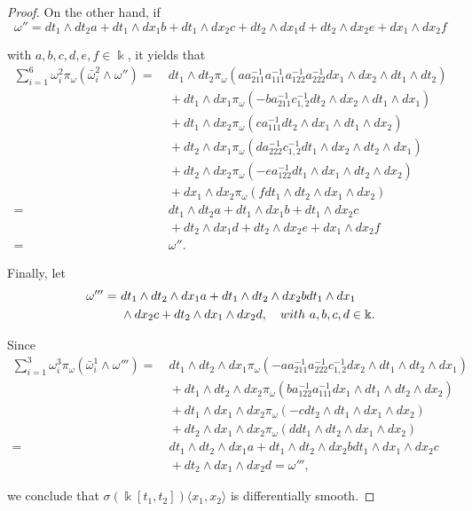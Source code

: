 \documentclass{amsart}
\theoremstyle{definition}
\theoremstyle{remark}
\numberwithin{equation}{section}
\begin{document}
\begin{proof}
On the other hand, if 
\[
\omega'' = dt_1\wedge dt_2a+dt_1\wedge dx_1 b+dt_1\wedge dx_2 c+dt_2\wedge dx_1d+dt_2\wedge dx_2e+dx_1\wedge dx_2f 
\]

with $a,b,c,d,e,f \in \Bbbk$, it yields that 
\begin{align*}
\sum_{i=1}^{6}\omega_{i}^{2}\pi_{\omega}(\bar{\omega}_i^{2}\wedge \omega'') = &\ dt_1\wedge dt_2\pi_{\omega}(aa_{211}^{-1}a_{111}^{-1}a_{122}^{-1}a_{222}^{-1}dx_1\wedge dx_2\wedge dt_1\wedge dt_2) \\
    &\ + dt_1\wedge dx_1\pi_{\omega}(-ba_{211}^{-1}c_{1,2}^{-1}dt_2\wedge dx_2\wedge dt_1\wedge dx_1) \\
    &\ +dt_1\wedge dx_2\pi_{\omega}(ca_{111}^{-1}dt_2\wedge dx_1\wedge dt_1\wedge dx_2) \\
    &\ +dt_2\wedge dx_1\pi_{\omega}(da_{222}^{-1}c_{1,2}^{-1}dt_1\wedge dx_2\wedge dt_2\wedge dx_1) \\
    &\ +dt_2\wedge dx_2\pi_{\omega}(-ea_{122}^{-1}dt_1\wedge dx_1\wedge dt_2\wedge dx_2) \\
    &\ +dx_1\wedge dx_2\pi_{\omega}(fdt_1\wedge dt_2\wedge dx_1\wedge dx_2) \\
    = &\ dt_1\wedge dt_2a+dt_1\wedge dx_1 b+dt_1\wedge dx_2 c \\
    &\ + dt_2\wedge dx_1d+dt_2\wedge dx_2e+dx_1\wedge dx_2f \\
    = &\ \omega''.
\end{align*}

Finally, let 
\begin{align*}
\omega''' = &\ dt_1\wedge dt_2 \wedge dx_1 a+ dt_1\wedge dt_2\wedge dx_2 b dt_1\wedge dx_1 \\
&\ \wedge dx_2 c+dt_2\wedge dx_1 \wedge dx_2 d, \quad {\rm with}\ a, b, c, d \in \Bbbk.
\end{align*}

Since 
\begin{align*}
\sum_{i=1}^{3}\omega_{i}^{3}\pi_{\omega}(\bar{\omega}_i^{1}\wedge \omega''') = &\ dt_1\wedge dt_2\wedge dx_1 \pi_{\omega}(-aa_{211}^{-1}a_{222}^{-1}c_{1,2}^{-1}dx_2\wedge dt_1\wedge dt_2\wedge dx_1) \\
    &\ + dt_1\wedge dt_2 \wedge dx_2\pi_{\omega}(ba_{122}^{-1}a_{111}^{-1}dx_1\wedge dt_1\wedge dt_2 \wedge dx_2 )\\
    &\ + dt_1\wedge dx_1 \wedge dx_2\pi_{\omega}(-cdt_2\wedge dt_1\wedge dx_1 \wedge dx_2 )\\
    &\ +dt_2\wedge dx_1 \wedge dx_2\pi_{\omega}(ddt_1\wedge dt_2\wedge dx_1 \wedge dx_2) \\
    = &\ dt_1\wedge dt_2\wedge dx_1 a+ dt_1\wedge dt_2\wedge dx_2 b dt_1\wedge dx_1 \wedge dx_2 c \\
    &\ +dt_2\wedge dx_1 \wedge dx_2 d =  \omega''', 
\end{align*}

we conclude that $\sigma(\Bbbk[t_1, t_2])\langle x_1, x_2\rangle$ is differentially smooth.
\end{proof}
\end{document}

